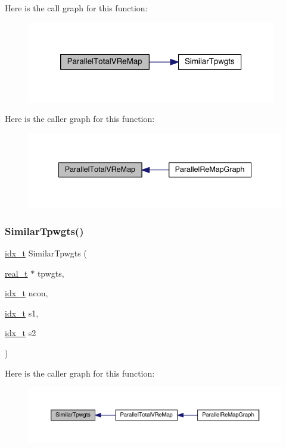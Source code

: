 Here is the call graph for this function\+:\nopagebreak
\begin{figure}[H]
\begin{center}
\leavevmode
\includegraphics[width=308pt]{a00395_a2ee84cc2bb186c63e443c5b0dee580d1_cgraph}
\end{center}
\end{figure}
Here is the caller graph for this function\+:\nopagebreak
\begin{figure}[H]
\begin{center}
\leavevmode
\includegraphics[width=338pt]{a00395_a2ee84cc2bb186c63e443c5b0dee580d1_icgraph}
\end{center}
\end{figure}
\mbox{\label{a00395_a356dd9e7483362d83646d132426d89fe}} 
\subsubsection{\texorpdfstring{Similar\+Tpwgts()}{SimilarTpwgts()}}
{\footnotesize\ttfamily \hyperlink{a00876_aaa5262be3e700770163401acb0150f52}{idx\+\_\+t} Similar\+Tpwgts (\begin{DoxyParamCaption}\item[{\hyperlink{a00876_a1924a4f6907cc3833213aba1f07fcbe9}{real\+\_\+t} $\ast$}]{tpwgts,  }\item[{\hyperlink{a00876_aaa5262be3e700770163401acb0150f52}{idx\+\_\+t}}]{ncon,  }\item[{\hyperlink{a00876_aaa5262be3e700770163401acb0150f52}{idx\+\_\+t}}]{s1,  }\item[{\hyperlink{a00876_aaa5262be3e700770163401acb0150f52}{idx\+\_\+t}}]{s2 }\end{DoxyParamCaption})}

Here is the caller graph for this function\+:\nopagebreak
\begin{figure}[H]
\begin{center}
\leavevmode
\includegraphics[width=350pt]{a00395_a356dd9e7483362d83646d132426d89fe_icgraph}
\end{center}
\end{figure}
